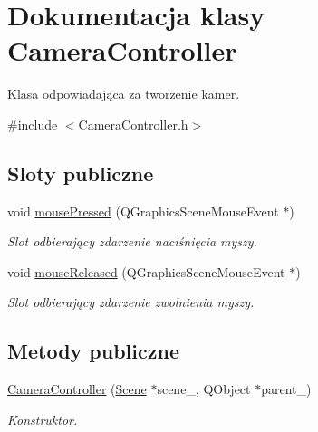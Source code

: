 \hypertarget{class_camera_controller}{\section{Dokumentacja klasy Camera\-Controller}
\label{class_camera_controller}
}


Klasa odpowiadająca za tworzenie kamer.  




{\ttfamily \#include $<$Camera\-Controller.\-h$>$}

\subsection*{Sloty publiczne}
\begin{DoxyCompactItemize}
\item 
void \hyperlink{class_camera_controller_a6c34f4a104a39e56c6c5aa9d11511a71}{mouse\-Pressed} (Q\-Graphics\-Scene\-Mouse\-Event $\ast$)
\begin{DoxyCompactList}\small\item\em Slot odbierający zdarzenie naciśnięcia myszy. \end{DoxyCompactList}\item 
void \hyperlink{class_camera_controller_aba3e7ac1af93e3b693a0e16c36da5762}{mouse\-Released} (Q\-Graphics\-Scene\-Mouse\-Event $\ast$)
\begin{DoxyCompactList}\small\item\em Slot odbierający zdarzenie zwolnienia myszy. \end{DoxyCompactList}\end{DoxyCompactItemize}
\subsection*{Metody publiczne}
\begin{DoxyCompactItemize}
\item 
\hyperlink{class_camera_controller_af3adb99b13661e6cba643be610ac9e5c}{Camera\-Controller} (\hyperlink{class_scene}{Scene} $\ast$scene\-\_\-, Q\-Object $\ast$parent\-\_)
\begin{DoxyCompactList}\small\item\em Konstruktor. \end{DoxyCompactList}\end{DoxyCompactItemize}
